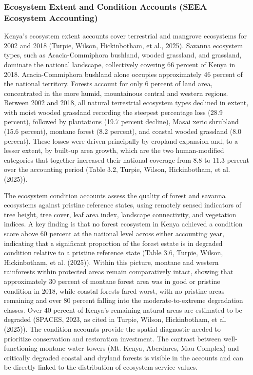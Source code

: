 \documentclass[
  letterpaper,
  DIV=11,
  numbers=noendperiod]{scrartcl}
\begin{document}
\subsubsection{Ecosystem Extent and Condition Accounts (SEEA Ecosystem
Accounting)}\label{ecosystem-extent-and-condition-accounts-seea-ecosystem-accounting}

Kenya's ecosystem extent accounts cover terrestrial and mangrove
ecosystems for 2002 and 2018 (Turpie, Wilson, Hickinbotham, et al.,
2025). Savanna ecosystem types, such as Acacia-Commiphora bushland,
wooded grassland, and grassland, dominate the national landscape,
collectively covering 66 percent of Kenya in 2018. Acacia-Commiphora
bushland alone occupies approximately 46 percent of the national
territory. Forests account for only 6 percent of land area, concentrated
in the more humid, mountainous central and western regions. Between 2002
and 2018, all natural terrestrial ecosystem types declined in extent,
with moist wooded grassland recording the steepest percentage loss (28.9
percent), followed by plantations (19.7 percent decline), Masai xeric
shrubland (15.6 percent), montane forest (8.2 percent), and coastal
wooded grassland (8.0 percent). These losses were driven principally by
cropland expansion and, to a lesser extent, by built-up area growth,
which are the two human-modified categories that together increased
their national coverage from 8.8 to 11.3 percent over the accounting
period (Table 3.2, Turpie, Wilson, Hickinbotham, et al. (2025)).

The ecosystem condition accounts assess the quality of forest and
savanna ecosystems against pristine reference states, using remotely
sensed indicators of tree height, tree cover, leaf area index, landscape
connectivity, and vegetation indices. A key finding is that no forest
ecosystem in Kenya achieved a condition score above 60 percent at the
national level across either accounting year, indicating that a
significant proportion of the forest estate is in degraded condition
relative to a pristine reference state (Table 3.6, Turpie, Wilson,
Hickinbotham, et al. (2025)). Within this picture, montane and western
rainforests within protected areas remain comparatively intact, showing
that approximately 30 percent of montane forest area was in good or
pristine condition in 2018, while coastal forests fared worst, with no
pristine areas remaining and over 80 percent falling into the
moderate-to-extreme degradation classes. Over 40 percent of Kenya's
remaining natural areas are estimated to be degraded (SPACES, 2023, as
cited in Turpie, Wilson, Hickinbotham, et al. (2025)). The condition
accounts provide the spatial diagnostic needed to prioritize
conservation and restoration investment. The contrast between
well-functioning montane water towers (Mt. Kenya, Aberdares, Mau
Complex) and critically degraded coastal and dryland forests is visible
in the accounts and can be directly linked to the distribution of
ecosystem service values.
\end{document}
